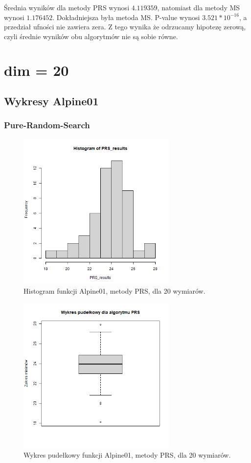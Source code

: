 \documentclass{lab}
\begin{document}
Średnia wyników dla metody PRS wynosi $4.119359$, natomiast dla metody MS wynosi $1.176452$. Dokładniejsza była metoda MS. P-value wynosi $3.521*10^{-16}$, a przedział ufności nie zawiera zera. Z tego wynika że odrzucamy hipotezę zerową, czyli średnie wyników obu algorytmów nie są sobie równe.

\section{dim = 20}
\subsection{Wykresy Alpine01}
\subsubsection{Pure-Random-Search}
\begin{figure}[H]
  \centering
  \includegraphics[width=0.7\textwidth]{img/dim20_PRS_Alpine01_his.png}
  \caption{Histogram funkcji Alpine01, metody PRS, dla 20 wymiarów.}
\end{figure}
\begin{figure}[H]
  \centering
  \includegraphics[width=0.7\textwidth]{img/dim20_PRS_Alpine01.png}
  \caption{Wykres pudełkowy funkcji Alpine01, metody PRS, dla 20 wymiarów.}
\end{figure}
\end{document}
